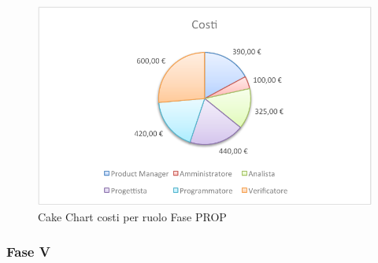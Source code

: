 				\begin{figure}[H]\centering
					\includegraphics[width=\textwidth]{PianoDiProgetto/Pics/ChartTotCostiFasePROP.pdf}
					\caption{Cake Chart costi per ruolo Fase PROP}
				\end{figure}
		\subsubsection{Fase V}
